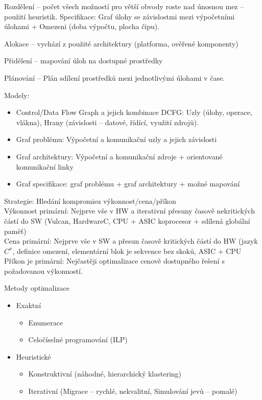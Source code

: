 \documentclass[a4paper, 11pt]{report}
\begin{document}
Rozdělení -- počet všech možností pro větší obvody roste nad únosnou mez -- použití heuristik. Specifikace: Graf úlohy se závislostmi mezi výpočetními úlohami + Omezeni (doba výpočtu, plocha čipu).

Alokace -- vychází z použité architektury (platforma, ověřené komponenty)

Přidělení -- mapování úloh na dostupné prostředky

Plánování -- Plán sdílení prostředků mezi jednotlivými úlohami v čase.

Modely:
\begin{itemize}
	\item Control/Data Flow Graph a jejich kombinace DCFG: Uzly (úlohy, operace, vlákna), Hrany (závislosti -- datové, řídící, využití zdrojů).
	\item Graf problému: Výpočetní a komunikační uzly a jejich závislosti
	\item Graf architektury: Výpočetní a komunikační zdroje + orientované komunikační linky
	\item Graf specifikace: graf problému + graf architektury + možné mapování
\end{itemize}

Strategie: Hledání kompromisu výkonnost/cena/příkon\\
Výkonnost primární: Nejprve vše v HW a iterativní přesuny časově nekritických částí do SW (Vulcan, HardwareC, CPU + ASIC koprocesor + sdílená globální paměť)\\
Cena primární: Nejprve vše v SW a přesun časově kritických částí do HW (jazyk $C^x$, definice omezení, elementární blok je sekvence bez skoků, ASIC + CPU \\
Příkon je primární: Nejčastěji optimalizace cenově dostupného řešení s požadovanou výkonností.

Metody optimalizace
\begin{itemize}
	\item Exaktní
	\begin{itemize}
		\item Enumerace
		\item Celočíselné programování (ILP)
	\end{itemize}
	\item Heuristické
	\begin{itemize}
		\item Konstruktivní (náhodné, hierarchický klastering)
		\item Iterativní (Migrace -- rychlé, nekvalitní, Simulování jevů -- pomalé)
	\end{itemize}
\end{itemize}
\end{document}
